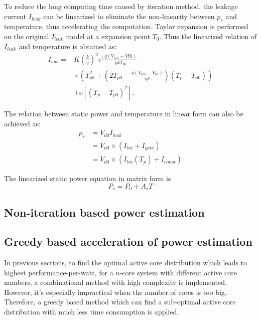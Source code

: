 To reduce the long computing time caused by iteration method, the leakage current $I_{leak}$ 
can be linearized to eliminate the non-linearity between $p_{s}$ and temperature, thus 
accelerating the computation.
Taylor expansion is performed on the original $I_{leak}$ model at a expansion point $T_{0}$. 
Thus the linearized relation of $I_{leak}$ and temperature is obtained as:
\begin{equation}\label{linear_subthreshold}
\begin{split}
I_{sub} = &K(\frac{k}{q})^{2}e^(\frac{q(V_{GS}-V{th})}{\eta kT_{p0}}\\
&\times (T_{p0}^{2}+(2T_{p0}-\frac{q(V_{GS}-V_{th})}{\eta k})(T_{p}-T_{p0}))\\
&+ o[(T_{p}-T_{p0})^{2}].
\end{split}
\end{equation}

The relation between static power and temperature in linear form can also be achieved as:
\begin{equation}\label{linear_static}
\begin{split}
p_{s} &= V_{dd}I_{leak}\\
&= V_{dd} \times (I_{lin}+I_{gate})\\
&= V_{dd} \times (I_{lin}(T_{p})+I_{const})
\end{split}
\end{equation}

The linearized static power equation in matrix form is
\begin{equation}\label{linear_static_matrix}
P_{s} = P_{0}+A_{s}T
\end{equation}

\subsection{Non-iteration based power estimation}

\subsection{Greedy based acceleration of power estimation}
In previous sections, to find the optimal active core distribution which leads to highest 
performance-per-watt, for a $n$-core system with different active core numbers,  a 
combinational method with high complexity is implemented. However, it's  especially 
impractical when the number of cores is too big. Therefore, a greedy based method which can
find a sub-optimal active core distribution with much less time consumption is applied.




